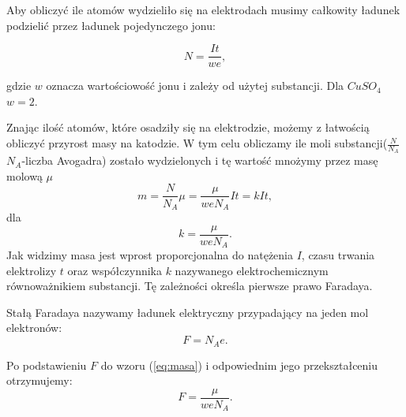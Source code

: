 \documentclass [a4paper,11pt]{article}
\begin{document}
		Aby obliczyć ile atomów wydzieliło się na elektrodach musimy całkowity ładunek podzielić przez ładunek pojedynczego jonu:
		
		\begin{equation}
		\label{eq:ilosc}
			N=\frac{It}{w e},
		\end{equation}
		
		gdzie $w$ oznacza wartościowość jonu i zależy od użytej substancji. Dla $CuSO_4$ $w=2$.

		Znając ilość atomów, które osadziły się na elektrodzie, możemy z łatwością obliczyć przyrost masy na katodzie. W tym celu obliczamy ile moli substancji($\frac{N}{N_A}$ $N_A$-liczba Avogadra) zostało wydzielonych i tę wartość mnożymy przez masę molową $\mu$
		\begin{equation}
		\label{eq:masa}
		m=\frac{N}{N_A} \mu = \frac{\mu}{weN_A}It =kIt,		
		\end{equation}
		dla
		\begin{equation}
		\label{eq:k}
			k=\frac{\mu}{weN_A}.
		\end{equation}
		Jak widzimy masa jest wprost proporcjonalna do natężenia $I$, czasu trwania elektrolizy $t$ oraz współczynnika $k$ nazywanego elektrochemicznym równoważnikiem substancji. Tę zależności określa pierwsze prawo Faradaya.
		
		Stałą Faradaya nazywamy ładunek elektryczny przypadający na jeden mol elektronów:
			\begin{equation}
				F=N_Ae.
			\end{equation}
		
		Po podstawieniu $F$ do wzoru (\ref{eq:masa}) i odpowiednim jego przekształceniu otrzymujemy:
			\begin{equation}
				\label{eq:F}
				F=\frac{\mu}{weN_A}.
			\end{equation} 
		 
\end{document}
